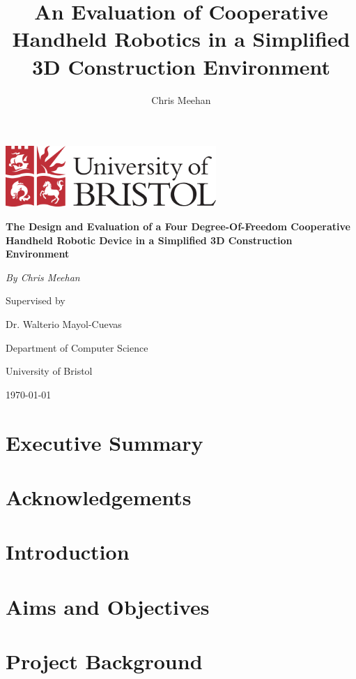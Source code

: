 \documentclass[11pt]{article}
\title{An Evaluation of Cooperative Handheld Robotics in a Simplified 3D Construction Environment}
\author{Chris Meehan}
\begin{document}
\begin{titlepage}
	\centering
	
	\includegraphics[width=0.6\textwidth]{bristol.png}
	\vspace{2cm}

	{\huge\bfseries The Design and Evaluation of a Four Degree-Of-Freedom Cooperative Handheld Robotic Device in a Simplified 3D Construction Environment\par}
	\vspace{1.5cm}

	{\Large\itshape By Chris Meehan\par}
	
	Supervised by\par
	Dr. Walterio Mayol-Cuevas
	
	\vspace{1.5cm}
	
	Department of Computer Science\par
	University of Bristol

	\vfill

	{\large \today\par}
\end{titlepage}

\section{Executive Summary}
\pagebreak

\section{Acknowledgements}
\pagebreak


\tableofcontents
\pagebreak

\section{Introduction}
\pagebreak

\section{Aims and Objectives}
\pagebreak

\section{Project Background}
\end{document}
